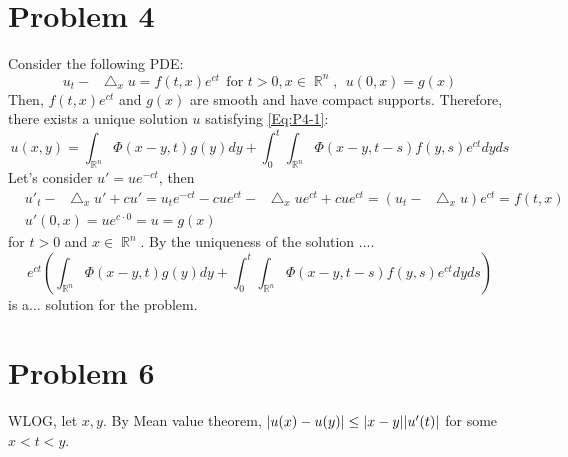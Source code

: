 \documentclass{article}
\DeclareMathOperator{\rr}{\mathbb{R}}
\newcommand*\Laplace{\mathop{}\!\mathbin\bigtriangleup}
\begin{document}
\section*{Problem 4}
Consider the following PDE:
\begin{equation}\label{Eq:P4-1}
u_t-\Laplace_x u=f(t,x)e^{ct}~~\text{for }t>0,x\in\rr^n,~~u(0,x)=g(x)
\end{equation}
Then, $f(t,x)e^{ct}$ and $g(x)$ are smooth and have compact supports. Therefore, there exists a unique solution $u$ satisfying \eqref{Eq:P4-1}:
\begin{equation*}
u(x,y)=\int_{\rr^n}\Phi(x-y,t)g(y)dy+\int_0^t\int_{\rr^n}\Phi(x-y,t-s)f(y,s)e^{ct}dyds
\end{equation*}
Let's consider $u'=ue^{-ct}$, then
\begin{equation*}
\begin{split}
&u'_t-\Laplace_x u'+cu'=u_te^{-ct}-cue^{ct}-\Laplace_x ue^{ct}+cue^{ct}=(u_t-\Laplace_x u)e^{ct}=f(t,x) \\
&u'(0,x)=ue^{c\cdot 0}=u=g(x)
\end{split}
\end{equation*}
for $t>0$ and $x\in \rr^n$. By the uniqueness of the solution ....
\begin{equation*}
e^{ct}\left(\int_{\rr^n}\Phi(x-y,t)g(y)dy+\int_0^t\int_{\rr^n}\Phi(x-y,t-s)f(y,s)e^{ct}dyds\right)
\end{equation*}
is a... solution for the problem.

\section*{Problem 6}
WLOG, let $x,y$. By Mean value theorem, $\abs{u(x)-u(y)}\leq \abs{x-y}\abs{u'(t)}$ for some $x<t<y$.
\end{document}
